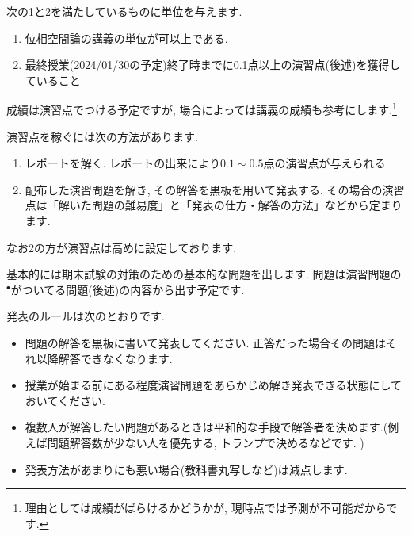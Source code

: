 \documentclass[dvipdfmx,a4paper,11pt]{article}
\theoremstyle{definition}
\begin{document}
次の1と2を満たしているものに単位を与えます.
\begin{enumerate}
  \setlength{\parskip}{0cm} %
  \setlength{\itemsep}{0cm} %
\item 位相空間論の講義の単位が可以上である.
\item 最終授業(2024/01/30の予定)終了時までに0.1点以上の演習点(後述)を獲得していること
\end{enumerate}
成績は演習点でつける予定ですが, 場合によっては講義の成績も参考にします.\footnote{理由としては成績がばらけるかどうかが, 現時点では予測が不可能だからです. }

\medskip
{}

演習点を稼ぐには次の方法があります.
\begin{enumerate}
  \setlength{\parskip}{0cm} 
  \setlength{\itemsep}{0cm} 
\item レポートを解く. レポートの出来により$0.1\sim0.5$点の演習点が与えられる.
\item 配布した演習問題を解き, その解答を黒板を用いて発表する. その場合の演習点は「解いた問題の難易度」と「発表の仕方・解答の方法」などから定まります.
\end{enumerate}

なお2の方が演習点は高めに設定しております.


\medskip
{}

基本的には期末試験の対策のための基本的な問題を出します.  問題は演習問題の$^{\bullet}$がついてる問題(後述)の内容から出す予定です.

\newpage
{}

発表のルールは次のとおりです.
\begin{itemize}
  \setlength{\parskip}{0cm} 
  \setlength{\itemsep}{0cm} 
\item 問題の解答を黒板に書いて発表してください. 正答だった場合その問題はそれ以降解答できなくなります. %
\item  授業が始まる前にある程度演習問題をあらかじめ解き発表できる状態にしておいてください.
\item 複数人が解答したい問題があるときは平和的な手段で解答者を決めます.(例えば問題解答数が少ない人を優先する, トランプで決めるなどです. )
\item 発表方法があまりにも悪い場合(教科書丸写しなど)は減点します.
\end{itemize}
\end{document}
